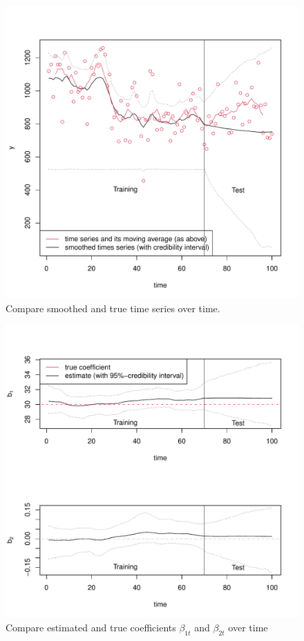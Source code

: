 \documentclass{article}
\begin{document}
\begin{figure}
	\centering
	\includegraphics[width=\textwidth]{smoothed_time_series.pdf}
	\caption{Compare smoothed and true time series over time.}
	\label{fig:fig2}
\end{figure}

\begin{figure}
	\centering
	\includegraphics[width=\textwidth]{coefficients_over_time.pdf}
	\caption{Compare estimated and true coefficients $\beta_{1t}$ and $\beta_{2t}$ over time}
	\label{fig:fig3}
\end{figure}
\end{document}
